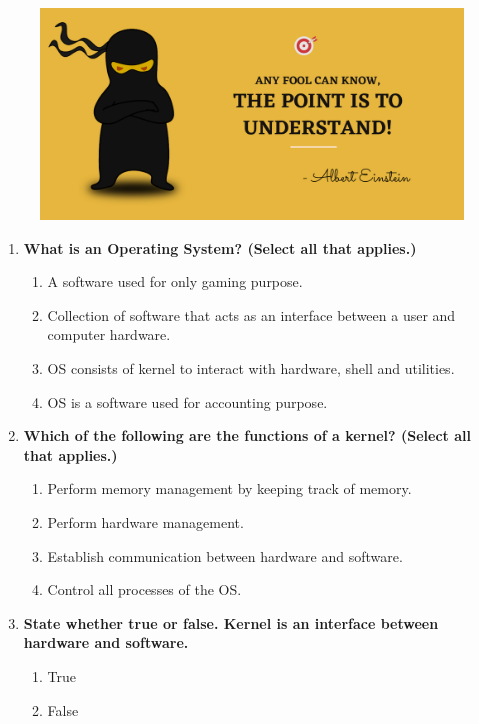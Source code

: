 \begin{flushleft}
	
	\bigskip
	
	\begin{figure}[h!]
		\centering
		\includegraphics[scale=.2]{content/practise.jpg}
	\end{figure}	
	\begin{enumerate}
		\item \textbf{What is an Operating System? (Select all that applies.)}
		\begin{enumerate}[label=(\alph*)]
			\item A software used for only gaming purpose.
			\item Collection of software that acts as an interface between a user and computer hardware. %
			\item OS consists of kernel to interact with hardware, shell and utilities. %
			\item OS is a software used for accounting purpose. %
		\end{enumerate}
		\bigskip
		\bigskip
		\item \textbf{Which of the following are the functions of a kernel? (Select all that applies.)}
		\begin{enumerate}[label=(\alph*)]
			\item Perform memory management by keeping track of memory. %
			\item Perform hardware management. %
			\item Establish communication between hardware and software. %
			\item Control all processes of the OS. %
		\end{enumerate}
		\bigskip
		\bigskip
		\item \textbf{State whether true or false. Kernel is an interface between hardware and software.}
		\begin{enumerate}[label=(\alph*)]
			\item True %
			\item False
		\end{enumerate}
	\end{enumerate}
	

\end{flushleft}

\newpage